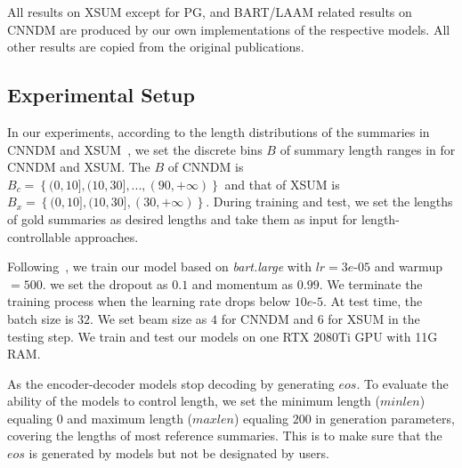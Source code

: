 All results on XSUM except for PG, and BART/LAAM related results
on CNNDM are produced by our own implementations of the respective models. All other results
are copied from the original publications. 

\subsection{Experimental Setup}
In our experiments, according to the length distributions of the summaries 
in CNNDM and XSUM~, 
we set the discrete bins $B$ of summary length ranges in  for CNNDM and XSUM.
The $B$ of CNNDM is $B_{c}=\left\{(0,10],(10,30],...,(90, +\infty)\right\}$ and that of XSUM is $B_{x}=\left\{(0,10],(10,30],(30, +\infty)\right\}$. 
During training and test,
we set the lengths of gold summaries as desired lengths and take them as input for length-controllable approaches.

Following~\citet{BART19},
we train our model based on  {\em bart.large} with
$lr=3e$-$05$ and warmup $=500$.
we set the dropout as $0.1$ and momentum as $0.99$.
We terminate the training process when the learning rate drops below $10e$-$5$. 
At test time, the batch size is $32$. 
We set beam size as $4$ for CNNDM and $6$ for XSUM in the testing step.
We train and test our models on one RTX 2080Ti GPU with 11G RAM. 


As the encoder-decoder models stop decoding by generating $eos$. 
To evaluate the ability of the models to control length,
we set the minimum length ($minlen$) equaling $0$ and maximum length ($maxlen$) equaling $200$ in generation parameters, covering the lengths of most reference summaries.
This is to make sure that the $eos$ is generated by models but not be designated by users.


